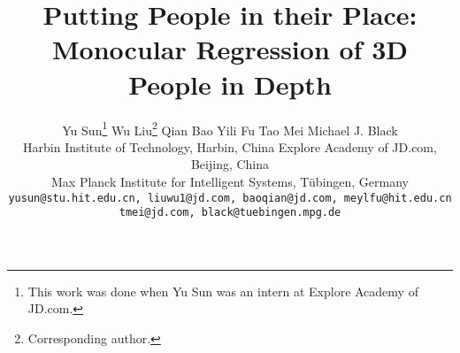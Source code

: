 \documentclass[10pt,twocolumn,letterpaper]{article}
\begin{document}
\title{Putting People in their Place: Monocular Regression of 3D People in Depth}
\makeatletter
\g@addto@macro{}

\author{Yu Sun\thanks{This work was done when Yu Sun was an intern at Explore Academy of JD.com. }\quad
Wu Liu\thanks{Corresponding author.} \quad
Qian Bao \quad
Yili Fu\quad
Tao Mei\quad
Michael J. Black \quad \\

Harbin Institute of Technology, Harbin, China \quad  Explore Academy of JD.com, Beijing, China \\
Max Planck Institute for Intelligent Systems, T\"ubingen, Germany\\
{\tt\small \texttt{yusun@stu.hit.edu.cn, liuwu1@jd.com, baoqian@jd.com, meylfu@hit.edu.cn}}\\
{\tt\small\texttt{tmei@jd.com, black@tuebingen.mpg.de}}\vspace{-2mm}
}

\makeatother

\maketitle
\end{document}
